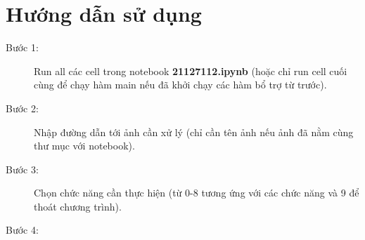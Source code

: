 \documentclass{article}
\begin{document}
\setlength{\parskip}{.7em}
\tableofcontents
\newpage

\setlength{\parskip}{.5em}
\newpage

\section{Hướng dẫn sử dụng}
\begin{description}
  \item[Bước 1:] Run all các cell trong notebook \textbf{21127112.ipynb} (hoặc chỉ run cell cuối cùng để chạy hàm main nếu đã khởi chạy các hàm bổ trợ từ trước).
  \item[Bước 2: ] Nhập đường dẫn tới ảnh cần xử lý (chỉ cần tên ảnh nếu ảnh đã nằm cùng thư mục với notebook).
  \item[Bước 3: ] Chọn chức năng cần thực hiện (từ 0-8 tương ứng với các chức năng và 9 để thoát chương trình).
  \item[Bước 4: ] 
\end{description}
\end{document}
